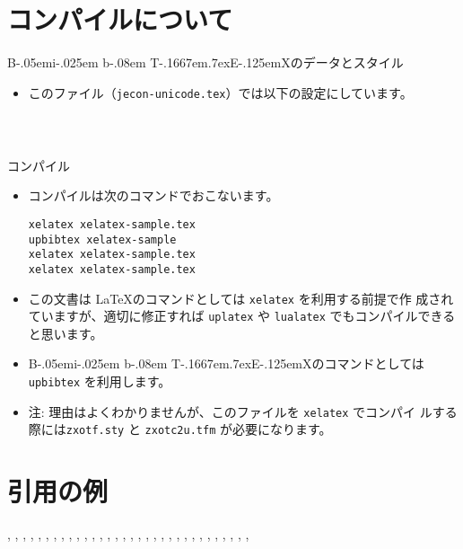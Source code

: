 \documentclass[10pt]{bxjsarticle}
\def\BibTeX{{\rm B\kern-.05em{\sc i\kern-.025em b}\kern-.08em
    T\kern-.1667em\lower.7ex\hbox{E}\kern-.125emX}}
\begin{document}
\section{コンパイルについて}

\BibTeX のデータとスタイル
\begin{itemize}
 \item このファイル（\texttt{jecon-unicode.tex}）では以下の設定にしています。
\begin{verbatim}
	
	
\end{verbatim}       
\end{itemize}

コンパイル
\begin{itemize}
 \item コンパイルは次のコマンドでおこないます。
\begin{verbatim}
xelatex xelatex-sample.tex
upbibtex xelatex-sample
xelatex xelatex-sample.tex		
xelatex xelatex-sample.tex
\end{verbatim}
 \item この文書は \LaTeX のコマンドとしては \texttt{xelatex} を利用する前提で作
       成されていますが、適切に修正すれば \texttt{uplatex} や \texttt{lualatex}
       でもコンパイルできると思います。
 \item \BibTeX のコマンドとしては \texttt{upbibtex} を利用します。
 \item 注: 理由はよくわかりませんが、このファイルを \texttt{xelatex} でコンパイ
       ルする際には\texttt{zxotf.sty} と \texttt{zxotc2u.tfm} が必要になります。
\end{itemize}


\section{引用の例}

\citet{oo99:_no_title}, \citet{oo100:_no_title}, \citet{120005678435}, 
\citet{120005614155}, \citet{Krey2014}, \citet{有村-蓬田2012}, 
\citet{Jaeger2011}, \citet{Ades-2010-EnergyUseand}, \citet{kuroda97jp:keo}, 
\citet{bohringer2007measuring}, \citet{Ahman2007}, \citet{横溝2007}, 
\citet{Bohringer2006}, \citet{chuokankyo06jp:ccs}, \citet{Mcconnell2005}, 
\citet{Stokey2004}, \citet{Loschel2002}, \citet{ihori02:_japa_tax}, 
\citet{Iregui-1999-EFFICIENCYGAINSFROM}, \citet{markusen99jp:trade_vol_1}, 
\citet{MaggiRodr'iguez-Clare-1998-ValueofTrade}, \citet{shigen97:_energ_balan}, 
\citet{barro97jp}, \citet{okura96jp:nihon-no-zeisei}, \citet{内田90}, 
\citet{samuelson67:_econo_found}, \citet{森201206}, \citet{nakamura00:_excel_io}, 
\citet{松浦2010a}, \citet{瀧川2006a}, 
\citet{bouet06:_is_erosion_of_tarif_prefer_serious_concer}, \citet{allais1953}
\citet{sample-test}, \citet{sample-test2}

\nocite{*}


% 

%

\end{document}
